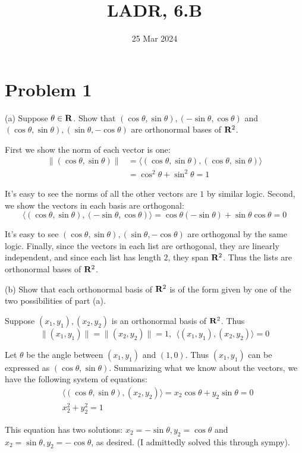 \documentclass{article}
\title{LADR, 6.B}
\date{25 Mar 2024}
\begin{document}
\maketitle

\section*{Problem 1}
(a) Suppose $\theta\in\mathbf{R}$. Show that $(\cos\theta,\sin\theta),(-\sin\theta,\cos\theta)$ and $(\cos\theta,\sin\theta),(\sin\theta,-\cos\theta)$ are orthonormal bases of $\mathbf{R}^2$.

\vs

First we show the norm of each vector is one:
\begin{align*}
\|(\cos\theta,\sin\theta)\|&=\langle (\cos\theta,\sin\theta),(\cos\theta,\sin\theta)\rangle\\
&=\cos^2\theta+\sin^2\theta=1
\end{align*}

It's easy to see the norms of all the other vectors are $1$ by similar logic. Second, we show the vectors in each basis are orthogonal:
\[\langle(\cos\theta,\sin\theta),(-\sin\theta,\cos\theta)\rangle=\cos\theta(-\sin\theta)+\sin\theta\cos\theta=0\]

It's easy to see $(\cos\theta,\sin\theta),(\sin\theta,-\cos\theta)$ are orthogonal by the same logic. Finally, since the vectors in each list are orthogonal, they are linearly independent, and since each list has length $2$, they span $\mathbf{R}^2$. Thus the lists are orthonormal bases of $\mathbf{R}^2$.

\vs

(b) Show that each orthonormal basis of $\mathbf{R}^2$ is of the form given by one of the two possibilities of part (a).

\vs

Suppose $(x_1, y_1), (x_2, y_2)$ is an orthonormal basis of $\mathbf{R}^2$. Thus
\[\|(x_1, y_1)\|=\|(x_2, y_2)\|=1,\ \ \langle(x_1, y_1), (x_2, y_2)\rangle=0\]

Let $\theta$ be the angle between $(x_1, y_1)$ and $(1, 0)$. Thus $(x_1, y_1)$ can be expressed as $(\cos\theta,\sin\theta)$. Summarizing what we know about the vectors, we have the following system of equations:
\begin{align*}
&\langle(\cos\theta,\sin\theta),(x_2, y_2)\rangle=x_2\cos\theta+y_2\sin\theta=0\\
&x_2^2+y_2^2=1
\end{align*}

This equation has two solutions: $x_2=-\sin\theta, y_2=\cos\theta$ and $x_2=\sin\theta, y_2=-\cos\theta$, as desired. (I admittedly solved this through sympy).
\end{document}
